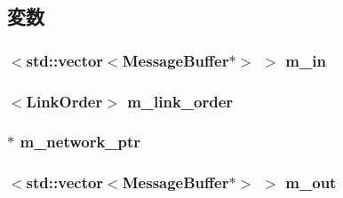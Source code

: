 \subsection{変数}
\hypertarget{classPerfectSwitch_ab0345216ab4e417dda296ba970b74c70}{
\subsubsection[{m\_\-in}]{$<${\bf std::vector}$<${\bf MessageBuffer}$\ast$$>$ $>$ {\bf m\_\-in}}}
\label{classPerfectSwitch_ab0345216ab4e417dda296ba970b74c70}
\hypertarget{classPerfectSwitch_a3dfc7818b7839c506d99739067de07db}{
\subsubsection[{m\_\-link\_\-order}]{$<${\bf LinkOrder}$>$ {\bf m\_\-link\_\-order}}}
\label{classPerfectSwitch_a3dfc7818b7839c506d99739067de07db}
\hypertarget{classPerfectSwitch_a512555c08578dfab6c301b43cc2b0f1b}{
\subsubsection[{m\_\-network\_\-ptr}]{$\ast$ {\bf m\_\-network\_\-ptr}}}
\label{classPerfectSwitch_a512555c08578dfab6c301b43cc2b0f1b}
\hypertarget{classPerfectSwitch_a6a473b3d280f223c89ffc2f5827d523f}{
\subsubsection[{m\_\-out}]{$<${\bf std::vector}$<${\bf MessageBuffer}$\ast$$>$ $>$ {\bf m\_\-out}}}
